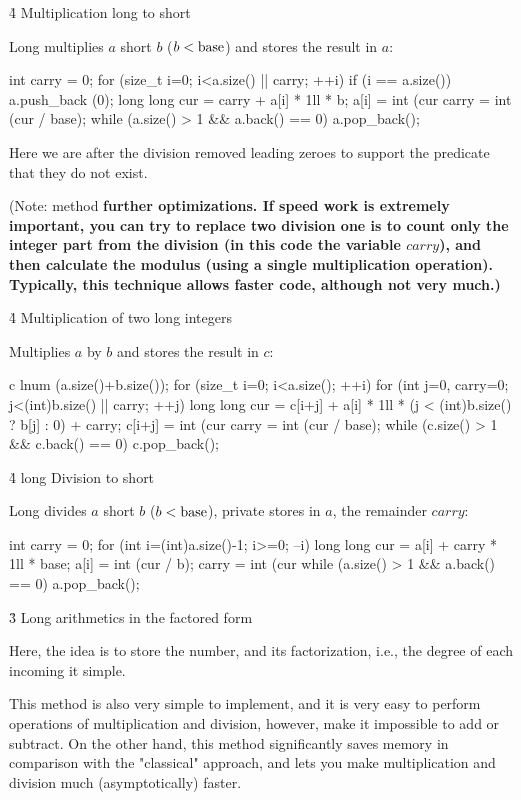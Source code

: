 \h4{ Multiplication long to short }

Long multiplies $a$ short $b$ ($b < {\rm base}$) and stores the result in $a$:

\code
int carry = 0;
for (size_t i=0; i<a.size() || carry; ++i) {
if (i == a.size())
a.push_back (0);
long long cur = carry + a[i] * 1ll * b;
a[i] = int (cur %
carry = int (cur / base);
}
while (a.size() > 1 && a.back() == 0)
a.pop_back();
\endcode

Here we are after the division removed leading zeroes to support the predicate that they do not exist.

(Note: method \bf{further optimizations}. If speed work is extremely important, you can try to replace two division one is to count only the integer part from the division (in this code the variable $carry$), and then calculate the modulus (using a single multiplication operation). Typically, this technique allows faster code, although not very much.)


\h4{ Multiplication of two long integers }

Multiplies $a$ by $b$ and stores the result in $c$:

\code
c lnum (a.size()+b.size());
for (size_t i=0; i<a.size(); ++i)
for (int j=0, carry=0; j<(int)b.size() || carry; ++j) {
long long cur = c[i+j] + a[i] * 1ll * (j < (int)b.size() ? b[j] : 0) + carry;
c[i+j] = int (cur %
carry = int (cur / base);
}
while (c.size() > 1 && c.back() == 0)
c.pop_back();
\endcode


\h4{ long Division to short }

Long divides $a$ short $b$ ($b < {\rm base}$), private stores in $a$, the remainder $carry$:

\code
int carry = 0;
for (int i=(int)a.size()-1; i>=0; --i) {
long long cur = a[i] + carry * 1ll * base;
a[i] = int (cur / b);
carry = int (cur %
}
while (a.size() > 1 && a.back() == 0)
a.pop_back();
\endcode


\h3{ Long arithmetics in the factored form }

Here, the idea is to store the number, and its factorization, i.e., the degree of each incoming it simple.

This method is also very simple to implement, and it is very easy to perform operations of multiplication and division, however, make it impossible to add or subtract. On the other hand, this method significantly saves memory in comparison with the "classical" approach, and lets you make multiplication and division much (asymptotically) faster.

